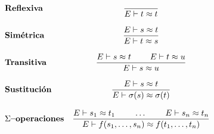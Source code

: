\[
  \begin{array}{lc}
    $\textbf{Reflexiva}$     & \dfrac{}{E \vdash t \approx t} \\ \\
    $\textbf{Sim\'{e}trica}$         & \dfrac{E \vdash s \approx t}{E \vdash t \approx s} \\ \\
    $\textbf{Transitiva}$    & \dfrac{E \vdash s \approx t  \hspace{.8cm}   E \vdash t \approx u}{E \vdash s \approx u} \\ \\
    $\textbf{Sustitución}$   & \dfrac{E \vdash s\approx t}{E \vdash \sigma(s)\approx \sigma(t)} \\ \\
    \Sigma$\textbf{--operaciones}$    & \dfrac{E \vdash s_1\approx t_1 \hspace{.8cm} \dots \hspace{.8cm} E \vdash s_n\approx t_n}{E \vdash f(s_1, \dots, s_n) \approx f(t_1,\dots,t_n)}
  \end{array} 
\]


